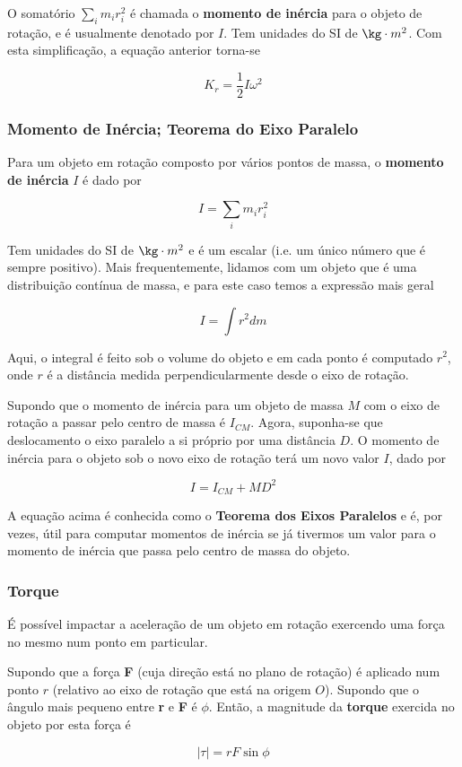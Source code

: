 O somatório $\sum_i m_ir_i^2$ é chamada o \textbf{momento de inércia} para o objeto de rotação, e é usualmente denotado por $I$. Tem unidades do SI de $\kg\cdot m^2$. Com esta simplificação, a equação anterior torna-se

\begin{equation}
    K_{r}=\frac{1}{2}I\omega^2
\end{equation}

\subsubsection{Momento de Inércia; Teorema do Eixo Paralelo}
Para um objeto em rotação composto por vários pontos de massa, o \textbf{momento de inércia} $I$ é dado por

\begin{equation}
    I=\sum_i m_ir_i^2
\end{equation}

Tem unidades do SI de $\kg\cdot m^2$ e é um escalar (i.e. um único número que é sempre positivo). Mais frequentemente, lidamos com um objeto que é uma distribuição contínua de massa, e para este caso temos a expressão mais geral

\begin{equation}
    I=\int r^2dm
\end{equation}

Aqui, o integral é feito sob o volume do objeto e em cada ponto é computado $r^2$, onde $r$ é a distância medida perpendicularmente desde o eixo de rotação.

Supondo que o momento de inércia para um objeto de massa $M$ com o eixo de rotação a passar pelo centro de massa é $I_{CM}$. Agora, suponha-se que deslocamento o eixo paralelo a si próprio por uma distância $D$. O momento de inércia para o objeto sob o novo eixo de rotação terá um novo valor $I$, dado por

\begin{equation}
    I=I_{CM}+MD^2
\end{equation}

A equação acima é conhecida como o \textbf{Teorema dos Eixos Paralelos} e é, por vezes, útil para computar momentos de inércia se já tivermos um valor para o momento de inércia que passa pelo centro de massa do objeto.

\subsubsection{Torque}
É possível impactar a aceleração de um objeto em rotação exercendo uma força no mesmo num ponto em particular.

Supondo que a força \textbf{F} (cuja direção está no plano de rotação) é aplicado num ponto $r$ (relativo ao eixo de rotação que está na origem $O$). Supondo que o ângulo mais pequeno entre \textbf{r} e \textbf{F} é $\phi$. Então, a magnitude da \textbf{torque} exercida no objeto por esta força é

\begin{equation}
    |\tau|=rF\sin \phi
\end{equation}